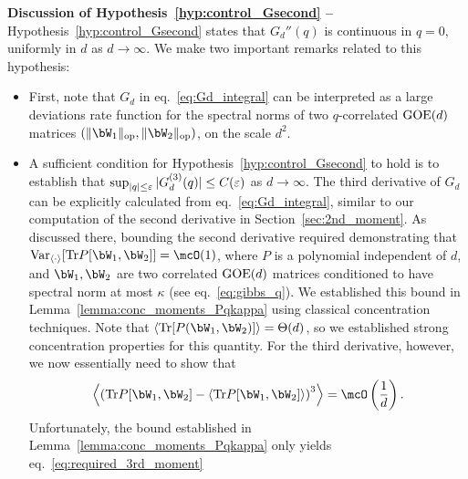 \noindent
\textbf{Discussion of Hypothesis~\ref{hyp:control_Gsecond} --}
Hypothesis~\ref{hyp:control_Gsecond} states that $G_d''(q)$ is continuous in $q = 0$, uniformly in $d$ as $d \to \infty$.
We make two important remarks related to this hypothesis:
\begin{itemize}[leftmargin=*]
    \item First, note that $G_d$ in eq.~\eqref{eq:Gd_integral} can be interpreted as a large deviations rate function for the spectral norms of two $q$-correlated $\mathrm{GOE}(d)$ matrices $(\|\bW_1\|_\op, \|\bW_2\|_\op)$, 
    on the scale $d^2$. 
    \item A sufficient condition for Hypothesis~\ref{hyp:control_Gsecond} to hold is to establish that $\sup_{|q| \leq \varepsilon} |G_d^{(3)}(q)| \leq C(\varepsilon)$ as $d \to \infty$.
    The third derivative of $G_d$ can be explicitly calculated from eq.~\eqref{eq:Gd_integral}, similar to our computation of the second derivative in Section~\ref{sec:2nd_moment}.
    As discussed there, bounding the second derivative required demonstrating that $\Var_{\langle \cdot \rangle}[\Tr P[\bW_1, \bW_2]] = \mcO(1)$, where $P$ is a polynomial independent of $d$, and $\bW_1, \bW_2$ are two correlated $\mathrm{GOE}(d)$ matrices conditioned to have spectral norm at most $\kappa$ (see eq.~\eqref{eq:gibbs_q}).
    We established this bound in Lemma~\ref{lemma:conc_moments_Pqkappa} using classical concentration techniques.
    Note that $\langle \Tr[P(\bW_1, \bW_2)]\rangle = \Theta(d)$, so we established strong concentration properties for this quantity.
    For the third derivative, however, we now essentially need to show that
    \begin{equation}\label{eq:required_3rd_moment}
        \left\langle\left(\Tr P[\bW_1, \bW_2] - \langle \Tr P[\bW_1, \bW_2] \rangle\right)^3\right\rangle = \mcO\left(\frac{1}{d}\right).
    \end{equation}
    Unfortunately, the bound established in Lemma~\ref{lemma:conc_moments_Pqkappa} only yields eq.~\eqref{eq:required_3rd_moment} 

\end{itemize}
